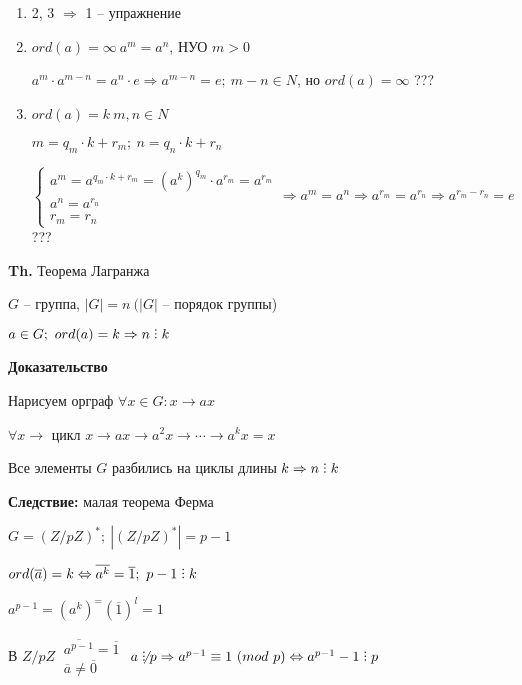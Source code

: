 \documentclass[14pt, letter paper]{article}
\DeclareRobustCommand{\divby}{%
  \mathrel{\text{\vbox{\baselineskip.65ex\lineskiplimit0pt\hbox{.}\hbox{.}\hbox{.}}}}%
}
\begin{document}
\begin{enumerate}
    \item 2, 3 $\Rightarrow$ 1 -- упражнение

    \item $ord(a) = \infty\ a^m = a^n$, НУО $m > 0$

    $a^m \cdot a^{m-n} = a^n \cdot e \Rightarrow a^{m-n} = e;\ m - n \in N$, но $ord(a) = \infty$ ???

    \item $ord(a) = k\ m,n \in N$

    $m = q_m \cdot k + r_m;\ n = q_n \cdot k + r_n$

    $\begin{cases}
        a^m = a^{q_m \cdot k + r_m} = (a^k)^{q_m} \cdot a^{r_m} = a^{r_m} \\
        a^n = a^{r_n} \\
        r_m = r_n
    \end{cases} \Rightarrow a^m = a^n \Rightarrow a^{r_m} = a^{r_n} \Rightarrow a^{r_m - r_n} = e$ ???
\end{enumerate}

\textbf{Th.} Теорема Лагранжа 

$G$ -- группа, $|G| = n\ (|G|$ -- порядок группы)

$a \in G;\ ord(a) = k \Rightarrow n \divby k$

\begin{center}
    \textbf{Доказательство}
\end{center}

Нарисуем орграф $\forall x \in G : x \rightarrow ax$

$\forall x \rightarrow$ цикл $x \rightarrow ax \rightarrow a^2x \rightarrow \cdots \rightarrow a^kx = x$

Все элементы $G$ разбились на циклы длины $k \Rightarrow n \divby k$

\textbf{Следствие:} малая теорема Ферма

$G = (Z/pZ)^*;\ |(Z/pZ)^*| = p - 1$

$ord(\overline{a}) = k \Leftrightarrow \overline{a^k} = \overline{1};\ p - 1 \divby k$

$a^{p-1} = (a^k)^ = (\overline{1})^l = 1$

В $Z/pZ\ \begin{gathered}
    \overline{a^{p-1}} = \overline{1} \\
    \overline{a} \neq \overline{0}
\end{gathered}$ $a \not\divby p \Rightarrow a^{p-1} \equiv 1\ (mod\ p) \Leftrightarrow a^{p-1} - 1 \divby p$
\end{document}
